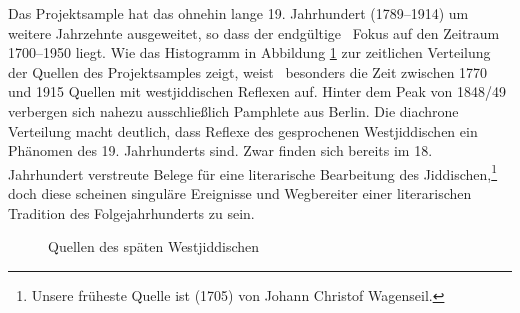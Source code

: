 Das Projektsample hat das ohnehin lange 19. Jahrhundert (1789–1914) um weitere Jahrzehnte ausgeweitet, so dass der endgültige \,%
Fokus auf den Zeitraum 1700–1950 liegt. Wie das Histogramm in Abbildung \ref{Quellenall} zur zeitlichen Verteilung der Quellen des Projektsamples zeigt, weist \,%
besonders die Zeit zwischen 1770 und 1915 Quellen mit westjiddischen Reflexen auf. Hinter dem Peak von 1848/49 verbergen sich nahezu ausschließlich Pamphlete aus Berlin. Die diachrone Verteilung macht deutlich, dass Reflexe des gesprochenen Westjiddischen ein Phänomen des 19. Jahrhunderts sind. Zwar finden sich bereits im 18. Jahrhundert verstreute Belege für eine literarische Bearbeitung des Jiddischen,\footnote{Unsere früheste Quelle ist  (1705) von Johann Christof Wagenseil.} doch diese scheinen singuläre Ereignisse und Wegbereiter einer literarischen Tradition des Folgejahrhunderts zu sein.

\begin{figure}
		\caption{Quellen des sp\"aten Westjiddischen}
		\label{Quellenall}
\end{figure}





